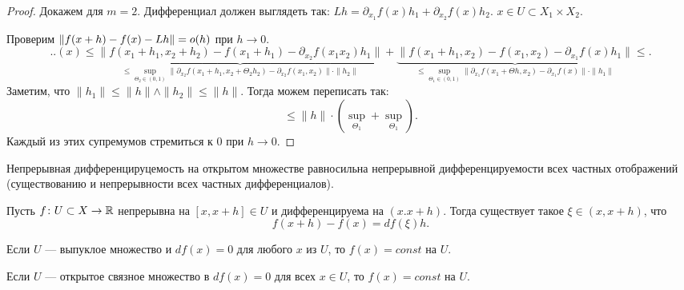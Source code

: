\begin{proof}
    Докажем для $ m =2$. Дифференциал должен выглядеть так:  $ Lh = \partial _{x_1}f(x)h_1 + \partial _{x_2}f(x)h_2$. $ x \in  U \subset X_1 \times X_2$.

    Проверим $ \| f(x+h) - f(x) - Lh \| = o(h)$ при $ h \to  0$.
    \[
	..(x) \le  \underbrace{\| f(x_1 + h_1, x_2+ h_2) - f(x_1 + h_1) - \partial _{x_2}f(x_1x_2)h_1 \|}_{ \le \sup_{\Theta_2 \in (0, 1)} \| \partial _{x_2} f(x_1+h_1, x_2+ \Theta_2 h_2) - \partial _{x_2}f(x_1, x_2) \| \cdot \| h_2 \| } + \underbrace{\| f(x_1 + h_1, x_2) - f(x_1, x_2) - \partial _{x_1}f(x)h_1 \|}_{ \le \sup_{\Theta_1 \in  (0, 1)} \| \partial _{x_1}f(x_1 + \Theta h, x_2) - \partial _{x_1}f(x) \| \cdot \| h_1 \| }  \le 
    .\] 
    Заметим, что $ \| h_1 \|  \le  \| h \| \wedge \| h_2 \| \le \| h \|  $.
    Тогда можем переписать  так: 
    \[
	\le \| h \|  \cdot \left( \sup_{\Theta_1} + \sup_{\Theta_1} \right) 
    .\] 
    Каждый из этих супремумов стремиться к 0 при $ h \to  0$.
\end{proof}
\begin{cor}
    Непрерывная дифференцируцемость на открытом множестве равносильна непрерывной дифференцируемости всех частных отображений (существованию и непрерывности всех частных дифференциалов). 
\end{cor}
\begin{thm}
    Пусть $ f\colon U \subset X \to  \mathbb{R}$ непрерывна на $ [x, x+h] \in U$ и дифференцируема на $ (x. x+h)$. Тогда существует такое  $ \xi \in (x, x+h)$, что
    \[
	f(x+h) - f(x) = df(\xi )h
    .\] 
\end{thm}
\begin{cor}
    Если $ U$ --- выпуклое множество и $ df(x) = 0$ для любого $ x$ из  $ U$, то  $ f(x) = const$ на  $ U$. 
\end{cor}
\begin{cor}
    Если $ U$ --- открытое связное множество в  $ df(x) = 0$ для всех  $ x \in  U$, то $ f(x) = const$ на  $ U$. 
\end{cor}
% 
